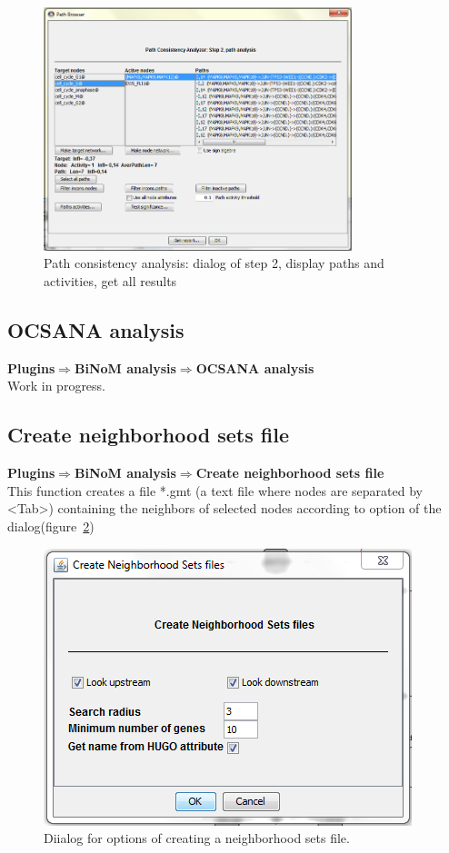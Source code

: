 \begin{figure}
\centering
\includegraphics[width=0.8\textwidth]{graphics/Path_consistency_analyser_Dialog2}
\caption{Path consistency analysis: dialog of step 2, display paths and activities, get all results}
\label{Path_consistency_analyser_Dialog2}
\end{figure}  

\subsection{OCSANA analysis}
\textbf{Plugins$\Rightarrow$BiNoM analysis$\Rightarrow$OCSANA analysis}\\

Work in progress.

\subsection{Create neighborhood sets file}
\textbf{Plugins$\Rightarrow$BiNoM analysis$\Rightarrow$Create neighborhood sets file}\\
This function creates a file *.gmt (a text file where nodes are separated by \textless Tab\textgreater) containing the neighbors of selected nodes according to option of the dialog(figure~\ref{Create_Neigborhood_File_Dialog})
\begin{figure}
\centering
\includegraphics[width=7 cm]{graphics/Create_Neigborhood_File_Dialog}
\caption{Diialog for options of creating a neighborhood sets file.}
\label{Create_Neigborhood_File_Dialog}
\end{figure}  